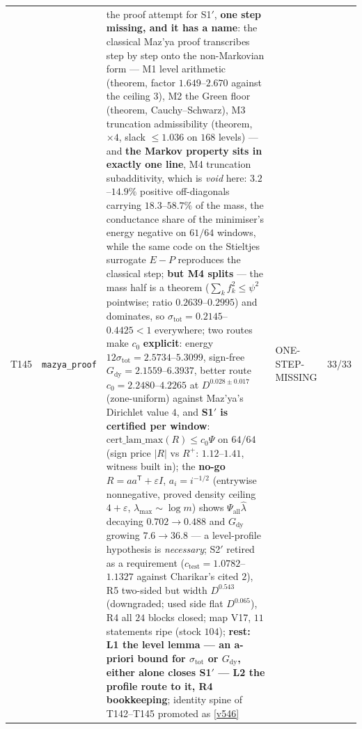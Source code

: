 \documentclass[11pt,a4paper]{article}
\begin{document}
{\begin{xltabular}{\linewidth}{@{}p{0.95cm} >{\raggedright\arraybackslash}p{3.1cm} Y >{\raggedright\scriptsize\arraybackslash}p{3.35cm} p{1.15cm}@{}}
T145 & \texttt{\scriptsize mazya\_\allowbreak proof} & the proof attempt for S1$'$, \textbf{one step missing, and it has a name}: the classical Maz'ya proof transcribes step by step onto the non-Markovian form --- M1 level arithmetic (theorem, factor $1.649$--$2.670$ against the ceiling $3$), M2 the Green floor (theorem, Cauchy--Schwarz), M3 truncation admissibility (theorem, $\times4$, slack $\le1.036$ on $168$ levels) --- and \textbf{the Markov property sits in exactly one line}, M4 truncation subadditivity, which is \emph{void} here: $3.2$--$14.9\%$ positive off-diagonals carrying $18.3$--$58.7\%$ of the mass, the conductance share of the minimiser's energy negative on $61/64$ windows, while the same code on the Stieltjes surrogate $E-P$ reproduces the classical step; \textbf{but M4 splits} --- the mass half is a theorem ($\sum_kf_k^2\le\psi^2$ pointwise; ratio $0.2639$--$0.2995$) and dominates, so $\sigma_{\mathrm{tot}}=0.2145$--$0.4425<1$ everywhere; two routes make $c_0$ \textbf{explicit}: energy $12\sigma_{\mathrm{tot}}=2.5734$--$5.3099$, sign-free $G_{\mathrm{dy}}=2.1559$--$6.3937$, better route $c_0=2.2480$--$4.2265$ at $D^{0.028\pm0.017}$ (zone-uniform) against Maz'ya's Dirichlet value $4$, and \textbf{S1$'$ is certified per window}: $\mathrm{cert\_lam\_max}(R)\le c_0\Psi$ on $64/64$ (sign price $|R|$ vs $R^{+}$: $1.12$--$1.41$, witness built in); the \textbf{no-go} $R=aa^{\mathsf T}+\varepsilon I$, $a_i=i^{-1/2}$ (entrywise nonnegative, proved density ceiling $4+\varepsilon$, $\lambda_{\max}\sim\log m$) shows $\Psi_{\mathrm{all}}\hat\lambda$ decaying $0.702\to0.488$ and $G_{\mathrm{dy}}$ growing $7.6\to36.8$ --- a level-profile hypothesis is \emph{necessary}; S2$'$ retired as a requirement ($c_{\mathrm{test}}=1.0782$--$1.1327$ against Charikar's cited $2$), R5 two-sided but width $D^{0.543}$ (downgraded; used side flat $D^{0.065}$), R4 all $24$ blocks closed; map V17, $11$ statements ripe (stock $104$); \textbf{rest: L1 the level lemma --- an a-priori bound for $\sigma_{\mathrm{tot}}$ or $G_{\mathrm{dy}}$, either alone closes S1$'$ --- L2 the profile route to it, R4 bookkeeping}; identity spine of T142--T145 promoted as \vref{v546} & ONE-STEP-MISSING & 33/33\\

\end{xltabular}}
\end{document}
